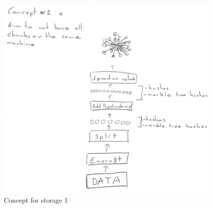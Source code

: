 \begin{figure}[htpb]
\centering
\begin{adjustbox}{center}
\includegraphics[scale=1]{annexes/concepts/oc-concept-storage-1.png}
\end{adjustbox}
\caption{Concept for storage 1
\label{fig:oc-concept-storage-1}} 
\end{figure}

